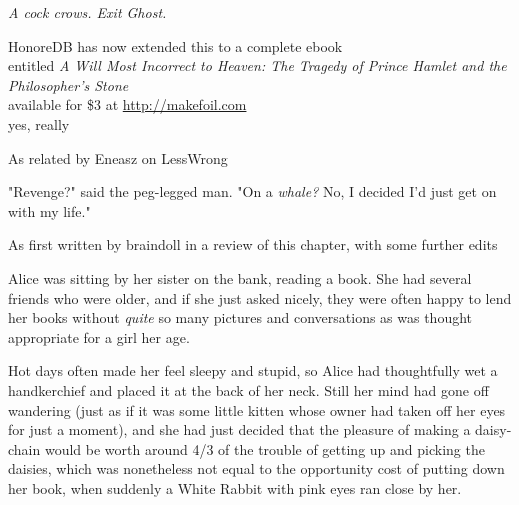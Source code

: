 \bigskip
\emph{A cock crows. Exit Ghost.}

\begin{center}
    \small
HonoreDB has now extended this to a complete ebook\\
entitled \emph{A Will Most Incorrect to Heaven: The Tragedy of Prince Hamlet and
the Philosopher's Stone}\\
available for \$3 at \url{http://makefoil.com}\\
yes, really
\end{center}
\vspace{-\baselineskip}
\sbreak
{}
\begin{center}
    \small
    As related by Eneasz on LessWrong
\end{center}
"Revenge?" said the peg-legged man. "On a \emph{whale?} No, I decided I'd just
get on with my life."
\sbreak
{}
\begin{center}
    \small
    As first written by braindoll in a review of this chapter, with some
    further edits
\end{center}
Alice was sitting by her sister on the bank, reading a book. She had several
friends who were older, and if she just asked nicely, they were often happy to
lend her books without \emph{quite} so many pictures and conversations as was
thought appropriate for a girl her age.

Hot days often made her feel sleepy and stupid, so Alice had thoughtfully wet a
handkerchief and placed it at the back of her neck. Still her mind had gone off
wandering (just as if it was some little kitten whose owner had taken off her
eyes for just a moment), and she had just decided that the pleasure of making a
daisy-chain would be worth around 4/3 of the trouble of getting up and picking
the daisies, which was nonetheless not equal to the opportunity cost of putting
down her book, when suddenly a White Rabbit with pink eyes ran close by her.

